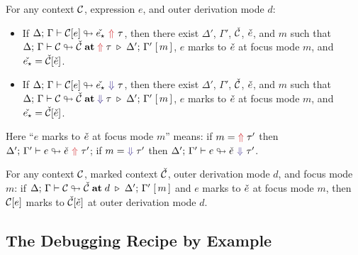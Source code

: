 \begin{majortheorembox}
%
\begin{theorem}\label{thm:mplug-decompose}
For any context $\mathcal{C}$, expression $e$, and outer derivation mode $d$:
\begin{itemize}
\item If\/ $\synmark{\C[e]}{\chk{e_\star}}{\tau}$, then there exist $\Delta'$, $\Gamma'$, $\check{\mathcal{C}}$, $\check{e}$, and $m$ such that $\mctxclass{\C}{\chk\C}{{\color{BrickRed}\Uparrow}\;\tau}{\Delta';\,\Gamma'}{m}$, $e$ marks to $\check{e}$ at focus mode $m$, and $\check{e_\star} = \check{\mathcal{C}}[\check{e}]$.
\item If\/ $\anamark{\C[e]}{\chk{e_\star}}{\tau}$, then there exist $\Delta'$, $\Gamma'$, $\check{\mathcal{C}}$, $\check{e}$, and $m$ such that $\mctxclass{\C}{\chk\C}{{\color{BlueViolet}\Downarrow}\;\tau}{\Delta';\,\Gamma'}{m}$, $e$ marks to $\check{e}$ at focus mode $m$, and $\check{e_\star} = \check{\mathcal{C}}[\check{e}]$.
\end{itemize}
Here ``$e$ marks to $\check{e}$ at focus mode $m$'' means: if $m = {\color{BrickRed}\Uparrow}\;\tau'$ then $\synmark[\Delta';\,\Gamma']{e}{\chk e}{\tau'}$; if $m = {\color{BlueViolet}\Downarrow}\;\tau'$ then $\anamark[\Delta';\,\Gamma']{e}{\chk e}{\tau'}$.
\end{theorem}
\end{majortheorembox}

\begin{majortheorembox}
%
\begin{theorem}\label{thm:mplug-compose}
For any context $\mathcal{C}$, marked context $\check{\mathcal{C}}$, outer derivation mode $d$, and focus mode $m$: if\/ $\Delta;\,\Gamma \vdash \mathcal{C} \looparrowright \check{\mathcal{C}}\;\mathbf{at}\;d\;\triangleright\;\Delta';\,\Gamma'\;[\,m\,]$ and $e$ marks to $\check{e}$ at focus mode $m$, then $\mathcal{C}[e]$ marks to $\check{\mathcal{C}}[\check{e}]$ at outer derivation mode $d$.
\end{theorem}
\end{majortheorembox}

\subsection{\no The Debugging Recipe by Example}
\label{sec:marking-recipes}

